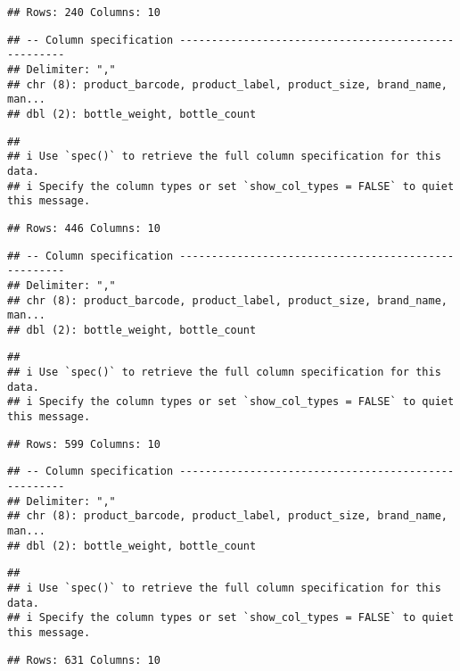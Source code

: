\documentclass[
]{article}
\begin{document}
\begin{verbatim}
## Rows: 240 Columns: 10
\end{verbatim}

\begin{verbatim}
## -- Column specification ----------------------------------------------------
## Delimiter: ","
## chr (8): product_barcode, product_label, product_size, brand_name, man...
## dbl (2): bottle_weight, bottle_count
\end{verbatim}

\begin{verbatim}
## 
## i Use `spec()` to retrieve the full column specification for this data.
## i Specify the column types or set `show_col_types = FALSE` to quiet this message.
\end{verbatim}

\begin{verbatim}
## Rows: 446 Columns: 10
\end{verbatim}

\begin{verbatim}
## -- Column specification ----------------------------------------------------
## Delimiter: ","
## chr (8): product_barcode, product_label, product_size, brand_name, man...
## dbl (2): bottle_weight, bottle_count
\end{verbatim}

\begin{verbatim}
## 
## i Use `spec()` to retrieve the full column specification for this data.
## i Specify the column types or set `show_col_types = FALSE` to quiet this message.
\end{verbatim}

\begin{verbatim}
## Rows: 599 Columns: 10
\end{verbatim}

\begin{verbatim}
## -- Column specification ----------------------------------------------------
## Delimiter: ","
## chr (8): product_barcode, product_label, product_size, brand_name, man...
## dbl (2): bottle_weight, bottle_count
\end{verbatim}

\begin{verbatim}
## 
## i Use `spec()` to retrieve the full column specification for this data.
## i Specify the column types or set `show_col_types = FALSE` to quiet this message.
\end{verbatim}

\begin{verbatim}
## Rows: 631 Columns: 10
\end{verbatim}
\end{document}
